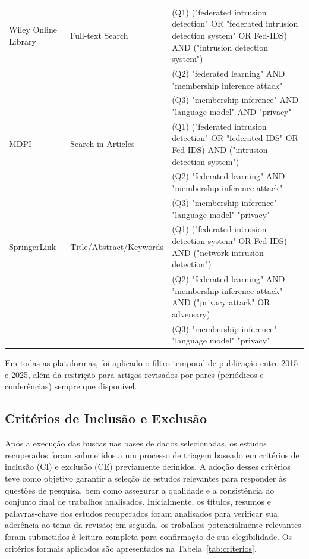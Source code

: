\documentclass[
	12pt,				%
	openright,			%
	oneside,			%
	a4paper,			%
	english,			%
	french,				%
	spanish,			%
	brazil,				%
	]{abntex2}
\begin{document}
\begin{table}[H]
\begin{tabular}{p{3cm} p{4cm} p{7cm}}
Wiley Online Library &
Full-text Search &
(Q1) ("federated intrusion detection" OR "federated intrusion detection system" OR Fed-IDS)
AND ("intrusion detection system") \\

& &
(Q2) "federated learning" AND "membership inference attack" \\

& &
(Q3) "membership inference" AND "language model" AND "privacy" \\
\hline

MDPI &
Search in Articles &
(Q1) ("federated intrusion detection" OR "federated IDS" OR Fed-IDS)
AND ("intrusion detection system") \\

& &
(Q2) "federated learning" AND "membership inference attack" \\

& &
(Q3) "membership inference" "language model" "privacy" \\
\hline

SpringerLink &
Title/Abstract/Keywords &
(Q1) ("federated intrusion detection system" OR Fed-IDS)
AND ("network intrusion detection") \\

& &
(Q2) "federated learning" AND "membership inference attack"
AND ("privacy attack" OR adversary) \\

& &
(Q3) "membership inference" "language model" "privacy" \\
\hline

\end{tabular}
\end{table}

Em todas as plataformas, foi aplicado o filtro temporal de publicação entre 2015 e 2025,
além da restrição para artigos revisados por pares (periódicos e conferências) sempre que
disponível.

\subsection{Critérios de Inclusão e Exclusão}

Após a execução das buscas nas bases de dados selecionadas, os estudos recuperados foram submetidos a um processo de triagem baseado em critérios de inclusão (CI) e exclusão (CE) previamente definidos. A adoção desses critérios teve como objetivo garantir a seleção de estudos relevantes para responder às questões de pesquisa, bem como assegurar a qualidade e a consistência do conjunto final de trabalhos analisados. Inicialmente, os títulos, resumos e palavras-chave dos estudos recuperados foram analisados para verificar sua aderência ao tema da revisão; em seguida, os trabalhos potencialmente relevantes foram submetidos à leitura completa para confirmação de sua elegibilidade. Os critérios formais aplicados são apresentados na Tabela~\ref{tab:criterios}.
\end{document}
